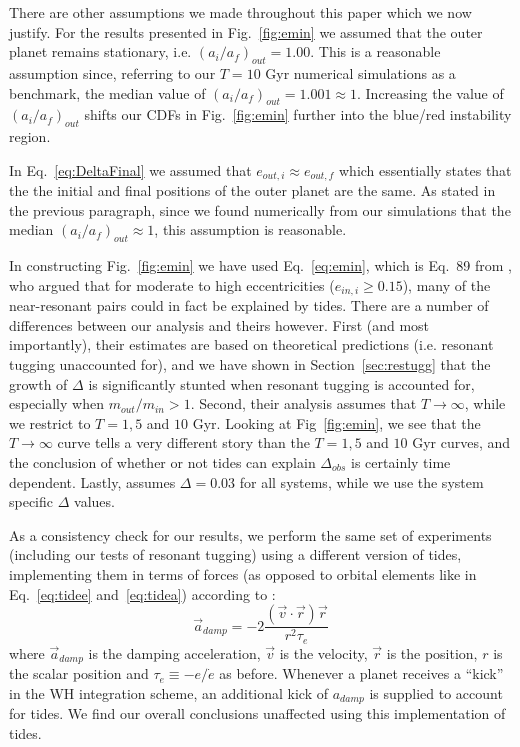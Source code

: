 There are other assumptions we made throughout this paper which we now justify.
For the results presented in Fig.~\ref{fig:emin} we assumed that the outer planet remains stationary, i.e. $(a_i /a_f)_{out} = 1.00$. 
This is a reasonable assumption since, referring to our $T = 10$ Gyr numerical simulations as a benchmark, the median value of $(a_i /a_f)_{out} = 1.001 \approx 1$.
Increasing the value of $(a_i /a_f)_{out}$ shifts our CDFs in Fig.~\ref{fig:emin} further into the blue/red instability region. 

In Eq.~\ref{eq:DeltaFinal} we assumed that $e_{out,i} \approx e_{out,f}$ which essentially states that the the initial and final positions of the outer planet are the same. 
As stated in the previous paragraph, since we found numerically from our simulations that the median $(a_i /a_f)_{out} \approx 1$, this assumption is reasonable. 

In constructing Fig.~\ref{fig:emin} we have used Eq.~\ref{eq:emin}, which is Eq.~89 from \cite{Delisle2014}, who argued that for moderate to high eccentricities ($e_{in,i} \geq 0.15$), many of the near-resonant pairs could in fact be explained by tides. 
There are a number of differences between our analysis and theirs however. 
First (and most importantly), their estimates are based on theoretical predictions (i.e. resonant tugging unaccounted for), and we have shown in Section~\ref{sec:restugg} that the growth of $\Delta$ is significantly stunted when resonant tugging is accounted for, especially when $m_{out} / m_{in} > 1$.
Second, their analysis assumes that $T \rightarrow \infty$, while we restrict to $T = 1, 5$ and $10$ Gyr. 
Looking at Fig~\ref{fig:emin}, we see that the $T \rightarrow \infty$ curve tells a very different story than the $T = 1, 5$ and $10$ Gyr curves, and the conclusion of whether or not tides can explain $\Delta_{obs}$ is certainly time dependent.
Lastly, \citeauthor{Delisle2014} assumes $\Delta = 0.03$ for all systems, while we use the system specific $\Delta$ values.

As a consistency check for our results, we perform the same set of experiments (including our tests of resonant tugging) using a different version of tides, implementing them in terms of forces (as opposed to orbital elements like in Eq.~\ref{eq:tidee} and~\ref{eq:tidea}) according to \cite{Papaloizou2000}:
\begin{equation}
\vec{a}_{damp} = -2\frac{(\vec{v} \cdot \vec{r}) \vec{r}}{r^2 \tau_e}
\label{eq:tideF}
\end{equation}
where $\vec{a}_{damp}$ is the damping acceleration, $\vec{v}$ is the velocity, $\vec{r}$ is the position, $r$ is the scalar position and $\tau_e \equiv - e/\dot{e}$ as before. 
Whenever a planet receives a ``kick'' in the WH integration scheme, an additional kick of $a_{damp}$ is supplied to account for tides. 
We find our overall conclusions unaffected using this implementation of tides.

